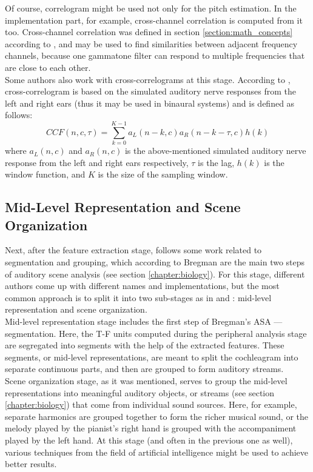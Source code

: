 Of course, correlogram might be used not only for the pitch estimation. In the implementation part, for example, cross-channel correlation is computed from it too. Cross-channel correlation was defined in section \ref{section:math_concepts} according to \cite{Wang2012}, and may be used to find similarities between adjacent frequency channels, because one gammatone filter can respond to multiple frequencies that are close to each other.\\

Some authors also work with cross-correlograms at this stage. According to \cite{Wang2006}, cross-correlogram is based on the simulated auditory nerve responses from the left and right ears (thus it may be used in binaural systems) and is defined as follows:
\begin{equation}
	CCF(n, c, \tau) = \sum_{k=0}^{K-1} a_L(n-k, c) a_R(n-k-\tau, c) h(k)
\end{equation}
where $a_L(n, c)$ and $a_R(n, c)$ is the above-mentioned simulated auditory nerve response from the left and right ears respectively, $\tau$ is the lag, $h(k)$ is the window function, and $K$ is the size of the sampling window.

\subsection{Mid-Level Representation and Scene Organization}\label{subsection:casa_segmentation_and_grouping}

Next, after the feature extraction stage, follows some work related to segmentation and grouping, which according to Bregman are the main two steps of auditory scene analysis (see section \ref{chapter:biology}). For this stage, different authors come up with different names and implementations, but the most common approach is to split it into two sub-stages as in \cite{Wang2006} and \cite{Jasti2020}: mid-level representation and scene organization.\\

Mid-level representation stage includes the first step of Bregman's ASA --- segmentation. Here, the T-F units computed during the peripheral analysis stage are segregated into segments with the help of the extracted features. These segments, or mid-level representations, are meant to split the cochleagram into separate continuous parts, and then are grouped to form auditory streams.\\

Scene organization stage, as it was mentioned, serves to group the mid-level representations into meaningful auditory objects, or streams (see section \ref{chapter:biology}) that come from individual sound sources. Here, for example, separate harmonics are grouped together to form the richer musical sound, or the melody played by the pianist's right hand is grouped with the accompaniment played by the left hand. At this stage (and often in the previous one as well), various techniques from the field of artificial intelligence might be used to achieve better results.\\

